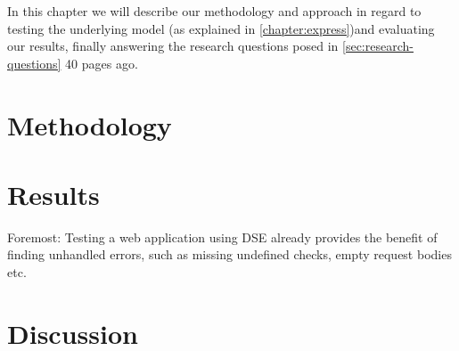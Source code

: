 In this chapter we will describe our methodology and approach in regard to testing the underlying model (as explained in \autoref{chapter:express})and evaluating our results, finally answering the research questions posed in \autoref{sec:research-questions} 40 pages ago.
\section{Methodology} 



\section{Results}
Foremost: Testing a web application using DSE already provides the benefit of finding unhandled errors, such as missing undefined checks, empty request bodies etc.



\section{Discussion}